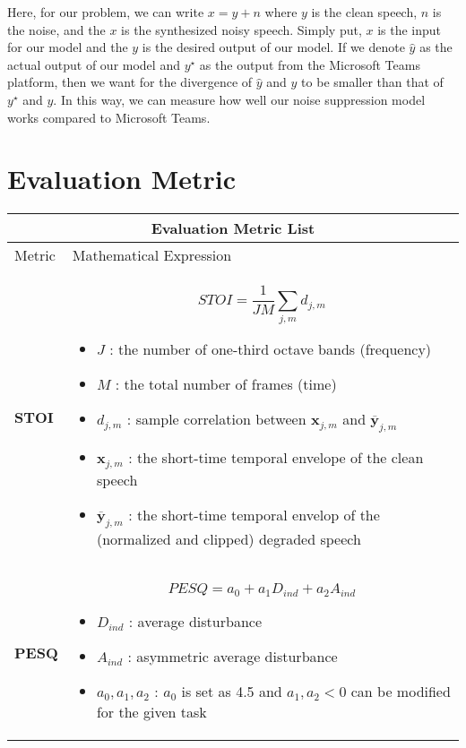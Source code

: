 \documentclass[11pt]{article}
\def\xv{\mathbf x}
\def\yv{\mathbf y}
\begin{document}
Here, for our problem, we can write $x = y+n$ where $y$ is the clean speech, $n$ is the noise, and the $x$ is the synthesized noisy speech. Simply put, $x$ is the input for our model and the $y$ is the desired output of our model. If we denote $\hat y$ as the actual output of our model and $y^\star$ as the output from the Microsoft Teams platform, then we want for the divergence of $\hat y$ and $y$  to be smaller than that of $y^ \star$ and $y$. In this way, we can measure how well our noise suppression model works compared to Microsoft Teams.

\section{Evaluation Metric}

\begin{tabular}{ |p{2.5cm}||p{11cm}|}
    \hline
    \multicolumn{2}{|c|}{Evaluation Metric List} \\
    \hline
    Metric &  Mathematical Expression\\
    \hline
    \vspace{2.5cm}\textbf{STOI}  & $$STOI = \frac{1}{JM}\sum_{j, m} d_{j,m}$$  \begin{itemize}
        \item $J$ : the number of one-third octave bands (frequency)
        \item $M$ : the total number of frames (time)
        \item $d_{j,m}$ : sample correlation between $\xv_{j,m}$ and $\overline{\yv}_{j,m}$
        \item $\xv_{j,m}$ : the short-time temporal envelope of the clean speech
        \item $\overline{\yv}_{j,m}$ : the short-time temporal envelop of the (normalized and clipped) degraded speech 
    \end{itemize} \\ 
    \hline
    \vspace{1.5cm}\textbf{PESQ} &   $$PESQ = a_0 + a_1 D_{ind} + a_2 A_{ind}$$
    \begin{itemize}
        \item $D_{ind}$ : average disturbance
        \item $A_{ind}$ : asymmetric average disturbance 
        \item $a_0, a_1, a_2$ : $a_0$ is set as 4.5 and $a_1, a_2 <0$ can be modified for the given task
    \end{itemize}  \\

\end{tabular}
\end{document}
